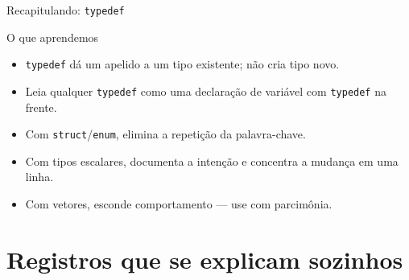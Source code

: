 \documentclass[aspectratio=169]{beamer}
\begin{document}
\begin{frame}{Recapitulando: \texttt{typedef}}
  \begin{block}{O que aprendemos}
    \begin{itemize}
      \item \texttt{typedef} dá um apelido a um tipo existente; não cria tipo novo.
      \item Leia qualquer \texttt{typedef} como uma declaração de variável com
        \texttt{typedef} na frente.
      \item Com \texttt{struct}/\texttt{enum}, elimina a repetição da palavra-chave.
      \item Com tipos escalares, documenta a intenção e concentra a mudança em
        uma linha.
      \item Com vetores, esconde comportamento --- use com parcimônia.
    \end{itemize}
  \end{block}
\end{frame}

\section{Registros que se explicam sozinhos}
\end{document}
